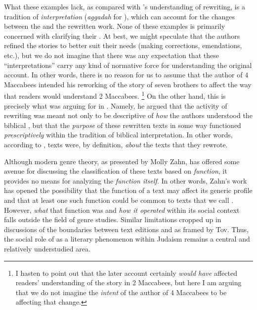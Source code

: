 What these examples lack, as compared with \vermes's understanding of rewriting, is a tradition of \emph{interpretation} (\emph{aggadah} for \vermes), which can account for the changes between the \vorlage and the rewritten work. None of these examples is primarily concerned with clarifying their \vorlage. At best, we might speculate that the authors refined the stories to better suit their needs (making corrections, emendations, etc.), but we do not imagine that there was any expectation that these ``interpretations'' carry any kind of normative force for understanding the original account. In other words, there is no reason for us to assume that the author of 4 Maccabees intended his reworking of the story of seven brothers to affect the way that readers would understand 2 Maccabees.%
    \footnote{%
        I hasten to point out that the later account certainly \emph{would have} affected readers' understanding of the story in 2 Maccabees, but here I am arguing that we do not imagine the \emph{intent} of the author of 4 Maccabees to be affecting that change.}
On the other hand, this is precisely what \vermes was arguing for in . Namely, he argued that the activity of rewriting was meant not only to be descriptive of \emph{how} the authors understood the biblical \vorlagen, but that the \emph{purpose} of these rewritten texts in some way functioned \emph{prescriptively} within the tradition of biblical interpretation. In other words, according to \vermes, \rwb texts were, by definition, \emph{about} the texts that they rewrote. 

Although modern genre theory, as presented by Molly Zahn, has offered some avenue for discussing the classification of these texts based on \emph{function}, it provides no means for analyzing the \emph{function itself}. In other words, Zahn's work has opened the possibility that the function of a text may affect its generic profile and that at least one such function could be common to texts that we call \rwb. However, \emph{what} that function was and \emph{how it operated} within its social context falls outside the field of genre studies. Similar limitations cropped up in discussions of the boundaries between text editions and \rwb as framed by Tov. Thus, the social role of \rwb as a literary phenomenon within \secondtemple Judaism remains a central and relatively understudied area.

